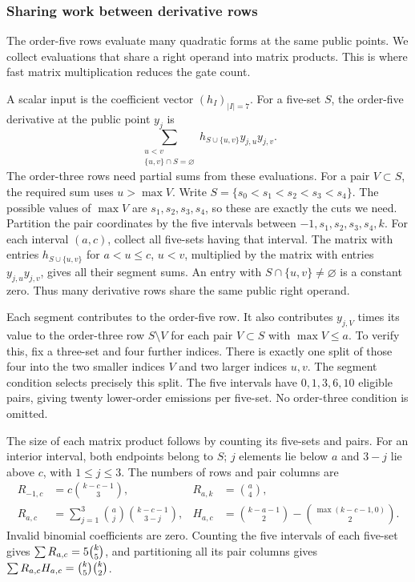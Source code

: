 \documentclass[b5paper, 10pt, abstract=true, captions=tableheading]{scrartcl}
\theoremstyle{plain}
\theoremstyle{definition}
\begin{document}
\subsubsection{Sharing work between derivative rows}
\label{sec:wopt-groupcount}
The order-five rows evaluate many quadratic forms at the same public
points. We collect evaluations that share a right operand into matrix
products. This is where fast matrix multiplication reduces the gate count.

A scalar input is the coefficient vector $(h_I)_{|I|=7}$.
For a five-set $S$, the order-five derivative at the public point $y_j$ is
\[
 \sum_{\substack{u<v\\\{u,v\}\cap S=\varnothing}}
 h_{S\cup\{u,v\}}y_{j,u}y_{j,v}.
\]
The order-three rows need partial sums from these evaluations. For a
pair $V\subset S$, the required sum uses $u>\max V$. Write
$S=\{s_0<s_1<s_2<s_3<s_4\}$. The possible values of $\max V$ are
$s_1,s_2,s_3,s_4$, so these are exactly the cuts we need.
Partition the pair coordinates by the five intervals between
$-1,s_1,s_2,s_3,s_4,k$. For each interval $(a,c)$, collect all five-sets
having that interval.
The matrix with entries $h_{S\cup\{u,v\}}$ for $a<u\leq c$, $u<v$,
multiplied by the matrix with entries $y_{j,u}y_{j,v}$, gives all their
segment sums. An entry with $S\cap\{u,v\}\ne\varnothing$ is a constant
zero. Thus many derivative rows share the same public right operand.

Each segment contributes to the order-five row. It also contributes
$y_{j,V}$ times its value to the order-three row $S\setminus V$ for each
pair $V\subset S$ with $\max V\leq a$. To verify this, fix a three-set
and four further indices. There is exactly one split of those four into
the two smaller indices $V$ and two larger indices $u,v$.
The segment condition selects precisely this split. The five intervals
have $0,1,3,6,10$ eligible pairs, giving twenty lower-order emissions
per five-set. No order-three condition is omitted.

The size of each matrix product follows by counting its five-sets and
pairs. For an interior interval, both endpoints belong to $S$; $j$
elements lie below $a$ and $3-j$ lie above $c$, with $1\leq j\leq3$.
The numbers of rows and pair columns are
\[
 \begin{aligned}
 R_{-1,c}&=c\binom{k-c-1}{3},&R_{a,k}&=\binom a4,\\
 R_{a,c}&=\sum_{j=1}^{3}\binom aj\binom{k-c-1}{3-j},&
 H_{a,c}&=\binom{k-a-1}{2}-\binom{\max(k-c-1,0)}2.
 \end{aligned}
\]
Invalid binomial coefficients are zero. Counting the five intervals of
each five-set gives $\sum R_{a,c}=5\binom{k}{5}$, and partitioning all its pair
columns gives $\sum R_{a,c}H_{a,c}=\binom{k}{5}\binom{k}{2}$.
\end{document}
